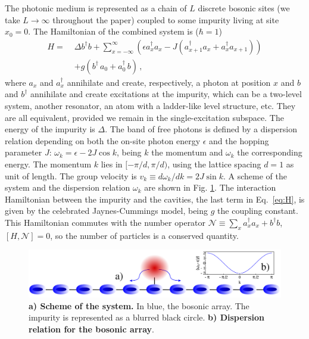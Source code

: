 \documentclass[aps,pra,twocolumn,floatfix,superscriptaddress]{revtex4-1}%
\begin{document}
The photonic medium is represented as a chain of $L$ discrete bosonic sites (we take $L\to\infty$ throughout the paper) coupled to some impurity living at site $x_0=0$. 
The Hamiltonian of the combined system is ($\hbar =1$)
\begin{align}
\label{eq:H} H   = \; &  
\Delta b^\dagger b  + 
\sum_{x=-\infty}^\infty \left(\epsilon a^\dagger_x a_x -  J ( a_{x+1}^\dagger a_x  + a_{x}^\dagger a_{x+1})\right)
 \nonumber\\
&  + g ( b^\dagger \,  a_0 +   a_0^\dagger \, b) \, ,
\end{align}
where $a_{x}$ and $a_{x}^\dagger$  annihilate and create, respectively, a photon at position $x$ and $b$ and $b^\dagger$ annihilate and create excitations at the impurity,
 which can be a two-level system, another resonator, an atom with a ladder-like level structure, etc. {\color{blue}They are all equivalent, provided we remain in the single-excitation subspace.}
The energy of the impurity is $\Delta$.
The band of free photons is defined by a dispersion relation depending on both the on-site photon energy $\epsilon$ and the hopping parameter $J$:  $\omega_k = \epsilon  - 2 J \cos k$, being $k$ the momentum and $\omega_k$ the corresponding energy. The momentum $k$ lies in $[-\pi/d,\pi/d)$, using the lattice spacing $d=1$ as unit of length. The group velocity is $v_k\equiv d\omega_k/dk=2J\sin k$. 
A scheme of the system and the dispersion relation $\omega_k$ are shown in Fig. \ref{fig:scheme}.
The interaction Hamiltonian between the impurity and the cavities, the last term in Eq.\ \eqref{eq:H}, is given by the celebrated Jaynes-Cummings model, being $g$ the coupling constant.
This Hamiltonian commutes with the number operator $\mathcal{N}\equiv \sum_x a_x^\dagger a_x + b^\dagger b$, $[H,\mathcal{N}]=0$, so the number of particles is a conserved quantity.


\begin{figure}[thb!]
\includegraphics[width=1\columnwidth]{fig1_imp_gimp.pdf}
\caption{ {\bf a) Scheme of the system.} In blue, the bosonic array. The impurity is represented as a blurred black circle. {\bf b) Dispersion relation for the bosonic array}.}\label{fig:scheme}
\end{figure}
\end{document}
